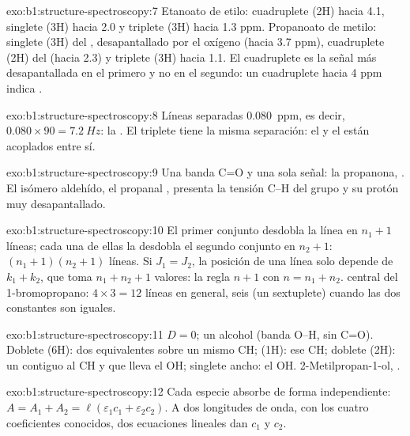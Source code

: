 \begin{solution}{exo:b1:structure-spectroscopy:7}
Etanoato de etilo: cuadruplete (2H) hacia 4.1, singlete (3H) hacia 2.0 y
triplete (3H) hacia 1.3 ppm. Propanoato de metilo: singlete (3H) del
, desapantallado por el oxígeno (hacia 3.7 ppm), cuadruplete
(2H) del  (hacia 2.3) y triplete (3H) hacia 1.1. El
cuadruplete es la señal más desapantallada en el primero y no en el
segundo: un cuadruplete hacia 4 ppm indica .
\end{solution}

\begin{solution}{exo:b1:structure-spectroscopy:8}
Líneas separadas \qty{0.080}{ppm}, es decir, $0.080 \times 90 = \qty{7.2}{Hz}$:
la . El triplete tiene la misma separación: el
 y el  están acoplados entre sí.
\end{solution}

\begin{solution}{exo:b1:structure-spectroscopy:9}
Una banda C=O y una sola señal: la propanona, . El isómero
aldehído, el propanal , presenta la tensión C--H del grupo
 y su protón muy desapantallado.
\end{solution}

\begin{solution}{exo:b1:structure-spectroscopy:10}
El primer conjunto desdobla la línea en $n_1 + 1$ líneas; cada una de
ellas la desdobla el segundo conjunto en $n_2 + 1$: $(n_1 + 1)(n_2 + 1)$
líneas. Si $J_1 =
J_2$, la posición de una línea solo depende de $k_1 + k_2$, que toma
$n_1 + n_2 +
1$ valores: la regla $n + 1$ con $n = n_1 + n_2$.  central del
1-bromopropano: $4 \times 3 = 12$ líneas en general, seis (un sextuplete)
cuando las dos constantes son iguales.
\end{solution}

\begin{solution}{exo:b1:structure-spectroscopy:11}
$D = 0$; un alcohol (banda O--H, sin C=O). Doblete (6H): dos 
equivalentes sobre un mismo CH;  (1H): ese CH; doblete (2H): un
 contiguo al CH y que lleva el OH; singlete ancho: el OH.
2-Metilpropan-1-ol, .
\end{solution}

\begin{solution}{exo:b1:structure-spectroscopy:12}
Cada especie absorbe de forma independiente: $A = A_1 + A_2 = \ell(\varepsilon_1c_1
+ \varepsilon_2c_2)$. A dos longitudes de onda, con los cuatro
coeficientes conocidos, dos ecuaciones lineales dan $c_1$ y $c_2$.
\end{solution}

